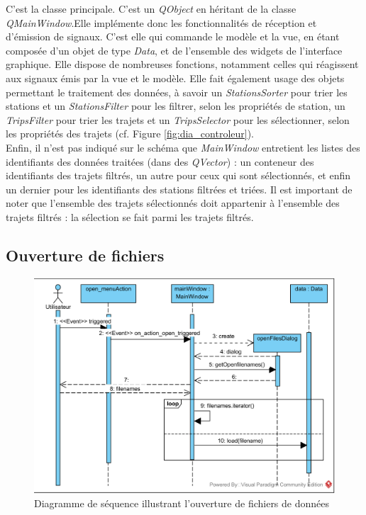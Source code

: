 \documentclass[12pt]{article}
\begin{document}
		C’est la classe principale. C’est un \textit{QObject} en héritant de la classe \textit{QMainWindow}.Elle implémente donc les fonctionnalités de réception et d’émission de signaux. C’est elle qui commande le modèle et la vue, en étant composée d’un objet de type \textit{Data}, et de l’ensemble des widgets de l’interface graphique. Elle dispose de nombreuses fonctions, notamment celles qui réagissent aux signaux émis par la vue et le modèle. Elle fait également usage des objets permettant le traitement des données, à savoir un \textit{StationsSorter} pour trier les stations et un \textit{StationsFilter} pour les filtrer, selon les propriétés de station, un \textit{TripsFilter} pour trier les trajets et un \textit{TripsSelector} pour les sélectionner, selon les propriétés des trajets (cf. Figure \ref{fig:dia_controleur}).\\
	
	Enfin, il n’est pas indiqué sur le schéma que \textit{MainWindow} entretient les listes des identifiants des données traitées (dans des \textit{QVector}) : un conteneur des identifiants des trajets filtrés, un autre pour ceux qui sont sélectionnés, et enfin un dernier pour les identifiants des stations filtrées et triées. Il est important de noter que l’ensemble des trajets sélectionnés doit appartenir à l’ensemble des trajets filtrés : la sélection se fait parmi les trajets filtrés.
		
		\subsection{Ouverture de fichiers}
		\begin{figure}[!h]
		\begin{center}
		\includegraphics[scale=1]{dia_sequence_openFiles.png}
		\caption{Diagramme de séquence illustrant l’ouverture de fichiers de données}
		\label{fig:seq_openFiles}
		\end{center}
		\end{figure}
			
\end{document}
